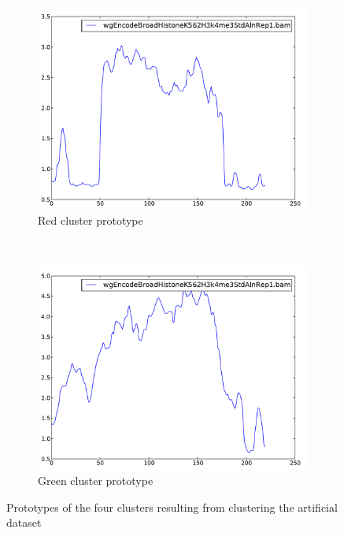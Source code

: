 \documentclass[parskip]{cs4rep}
\begin{document}
\begin{figure}[t,b]
    ~
    \begin{subfigure}[b]{0.22\textwidth}
        \includegraphics[width=\textwidth]{figures/evaluation/exon_stretching/cluster-3.pdf}
        \caption{Red cluster prototype}
        \label{fig:evaluation:exon_stretching:clusters:3:prototype}
    \end{subfigure}
    ~
    \begin{subfigure}[b]{0.22\textwidth}
        \includegraphics[width=\textwidth]{figures/evaluation/exon_stretching/cluster-4.pdf}
        \caption{Green cluster prototype}
        \label{fig:evaluation:exon_stretching:clusters:4:prototype}
    \end{subfigure}
    \caption{Prototypes of the four clusters resulting from clustering the artificial dataset}
    \label{fig:evaluation:exon_stretching:clusters:prototypes}
\end{figure}
\end{document}
